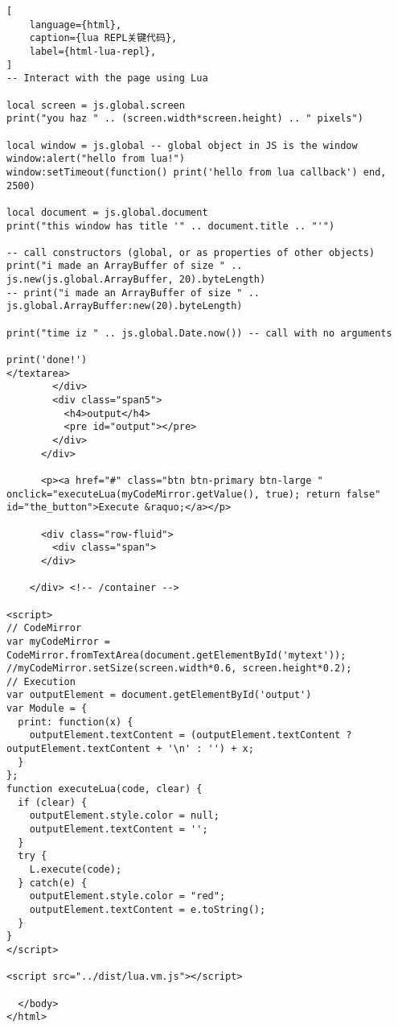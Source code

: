 \begin{lstlisting}[
    language={html},
    caption={lua REPL关键代码},
    label={html-lua-repl},
]
-- Interact with the page using Lua

local screen = js.global.screen
print("you haz " .. (screen.width*screen.height) .. " pixels")

local window = js.global -- global object in JS is the window
window:alert("hello from lua!")
window:setTimeout(function() print('hello from lua callback') end, 2500)

local document = js.global.document
print("this window has title '" .. document.title .. "'")

-- call constructors (global, or as properties of other objects)
print("i made an ArrayBuffer of size " .. js.new(js.global.ArrayBuffer, 20).byteLength)
-- print("i made an ArrayBuffer of size " .. js.global.ArrayBuffer:new(20).byteLength)

print("time iz " .. js.global.Date.now()) -- call with no arguments

print('done!')
</textarea>
        </div>
        <div class="span5">
          <h4>output</h4>
          <pre id="output"></pre>
        </div>
      </div>

      <p><a href="#" class="btn btn-primary btn-large " onclick="executeLua(myCodeMirror.getValue(), true); return false" id="the_button">Execute &raquo;</a></p>

      <div class="row-fluid">
        <div class="span">
      </div>

    </div> <!-- /container -->

<script>
// CodeMirror
var myCodeMirror = CodeMirror.fromTextArea(document.getElementById('mytext'));
//myCodeMirror.setSize(screen.width*0.6, screen.height*0.2);
// Execution
var outputElement = document.getElementById('output')
var Module = {
  print: function(x) {
    outputElement.textContent = (outputElement.textContent ? outputElement.textContent + '\n' : '') + x;
  }
};
function executeLua(code, clear) {
  if (clear) {
    outputElement.style.color = null;
    outputElement.textContent = '';
  }
  try {
    L.execute(code);
  } catch(e) {
    outputElement.style.color = "red";
    outputElement.textContent = e.toString();
  }
}
</script>

<script src="../dist/lua.vm.js"></script>

  </body>
</html>
\end{lstlisting}

